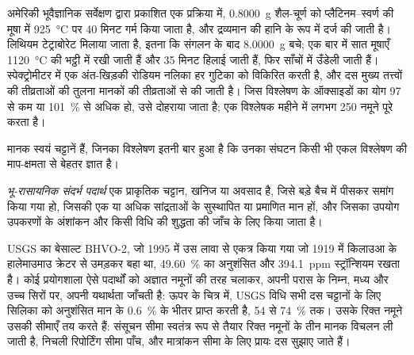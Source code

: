\begin{inthelab}[संगलित गुटिकाओं का एक बैच]
अमेरिकी भूवैज्ञानिक सर्वेक्षण द्वारा प्रकाशित एक प्रक्रिया में, \qty{0.8000}{g} शैल-चूर्ण को
प्लैटिनम--स्वर्ण की मूषा में \qty{925}{\celsius} पर 40 मिनट गर्म किया जाता है, और द्रव्यमान की हानि
 के रूप में दर्ज की जाती है। लिथियम टेट्राबोरेट मिलाया जाता है, इतना कि संगलन के बाद \qty{8.0000}{g} बचे;
एक बार में सात मूषाएँ \qty{1120}{\celsius} की भट्ठी में रखी जाती हैं और 35 मिनट हिलाई जाती हैं,
फिर साँचों में उँडेली जाती हैं। स्पेक्ट्रोमीटर में एक अंत-खिड़की रोडियम नलिका हर गुटिका को विकिरित करती है, और
दस मुख्य तत्त्वों की तीव्रताओं की तुलना मानकों की तीव्रताओं से की जाती है। जिस विश्लेषण के
ऑक्साइडों का योग 97 से कम या \qty{101}{\percent} से अधिक हो, उसे दोहराया जाता है; एक विश्लेषक महीने में
लगभग 250 नमूने पूरे करता है।
\end{inthelab}

मानक स्वयं चट्टानें हैं, जिनका विश्लेषण इतनी बार हुआ है कि उनका संघटन किसी भी एकल विश्लेषण
की माप-क्षमता से बेहतर ज्ञात है।

\begin{definition}[भू-रासायनिक संदर्भ पदार्थ]\label{def:b2:field-lab-methods-2:rm}
\emph{भू-रासायनिक संदर्भ पदार्थ} एक प्राकृतिक चट्टान,
खनिज या अवसाद है, जिसे बड़े बैच में पीसकर समांग किया गया हो, जिसकी एक या अधिक सांद्रताओं के
सुस्थापित या प्रमाणित मान हों, और जिसका उपयोग उपकरणों के अंशांकन और किसी विधि की शुद्धता
की जाँच के लिए किया जाता है।
\end{definition}

USGS का बेसाल्ट BHVO-2, जो 1995 में उस लावा से एकत्र किया गया जो 1919 में किलाउआ के हालेमाउमाउ क्रेटर से
उमड़कर बहा था, \qty{49.60}{\percent} का अनुशंसित  और \qty{394.1}{ppm}
स्ट्रॉन्शियम रखता है। कोई प्रयोगशाला ऐसे पदार्थों को अज्ञात नमूनों की तरह चलाकर, अपनी परास के निम्न,
मध्य और उच्च सिरों पर, अपनी यथार्थता जाँचती है: ऊपर के चित्र में, USGS विधि सभी दस चट्टानों के लिए सिलिका को
अनुशंसित मान के \qty{0.6}{\percent} के भीतर प्राप्त करती है,  54 से
\qty{74}{\percent} तक। उसके रिक्त नमूने उसकी सीमाएँ तय करते हैं: संसूचन सीमा स्वतंत्र रूप से तैयार
रिक्त नमूनों के तीन मानक विचलन ली जाती है, निचली रिपोर्टिंग सीमा पाँच, और मात्रांकन सीमा के लिए
प्रायः दस सुझाए जाते हैं।

